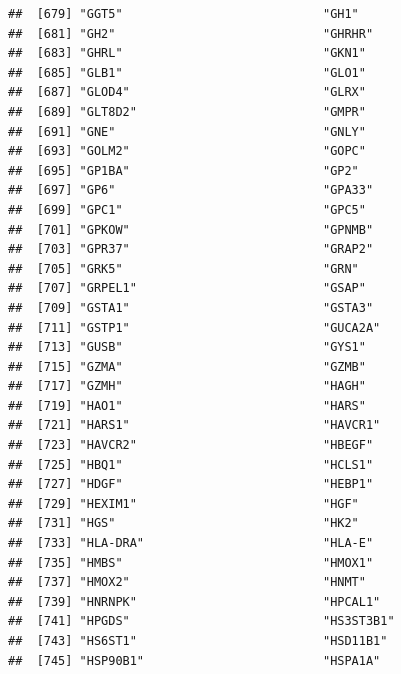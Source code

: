 \documentclass[
]{article}
\begin{document}
\begin{verbatim}
##  [679] "GGT5"                            "GH1"                            
##  [681] "GH2"                             "GHRHR"                          
##  [683] "GHRL"                            "GKN1"                           
##  [685] "GLB1"                            "GLO1"                           
##  [687] "GLOD4"                           "GLRX"                           
##  [689] "GLT8D2"                          "GMPR"                           
##  [691] "GNE"                             "GNLY"                           
##  [693] "GOLM2"                           "GOPC"                           
##  [695] "GP1BA"                           "GP2"                            
##  [697] "GP6"                             "GPA33"                          
##  [699] "GPC1"                            "GPC5"                           
##  [701] "GPKOW"                           "GPNMB"                          
##  [703] "GPR37"                           "GRAP2"                          
##  [705] "GRK5"                            "GRN"                            
##  [707] "GRPEL1"                          "GSAP"                           
##  [709] "GSTA1"                           "GSTA3"                          
##  [711] "GSTP1"                           "GUCA2A"                         
##  [713] "GUSB"                            "GYS1"                           
##  [715] "GZMA"                            "GZMB"                           
##  [717] "GZMH"                            "HAGH"                           
##  [719] "HAO1"                            "HARS"                           
##  [721] "HARS1"                           "HAVCR1"                         
##  [723] "HAVCR2"                          "HBEGF"                          
##  [725] "HBQ1"                            "HCLS1"                          
##  [727] "HDGF"                            "HEBP1"                          
##  [729] "HEXIM1"                          "HGF"                            
##  [731] "HGS"                             "HK2"                            
##  [733] "HLA-DRA"                         "HLA-E"                          
##  [735] "HMBS"                            "HMOX1"                          
##  [737] "HMOX2"                           "HNMT"                           
##  [739] "HNRNPK"                          "HPCAL1"                         
##  [741] "HPGDS"                           "HS3ST3B1"                       
##  [743] "HS6ST1"                          "HSD11B1"                        
##  [745] "HSP90B1"                         "HSPA1A"                         

\end{verbatim}
\end{document}
